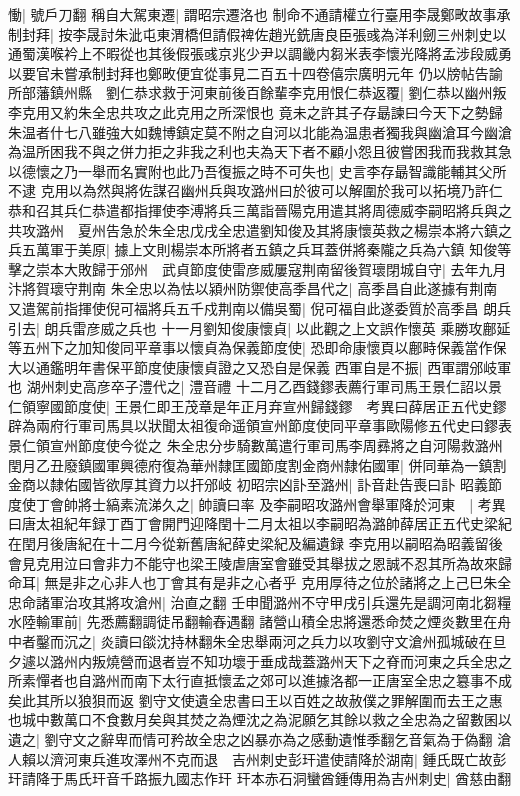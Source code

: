 慟|{
	號戶刀翻}
稱自大駕東遷|{
	謂昭宗遷洛也}
制命不通請權立行臺用李晟鄭畋故事承制封拜|{
	按李晟討朱泚屯東渭橋但請假禆佐趙光銑唐良臣張彧為洋利劒三州刺史以通蜀漢喉衿上不暇從也其後假張彧京兆少尹以調畿内芻米表李懷光降將孟涉段威勇以要官未嘗承制封拜也鄭畋便宜從事見二百五十四卷僖宗廣明元年}
仍以牓帖告諭所部藩鎮州縣　劉仁恭求救于河東前後百餘輩李克用恨仁恭返覆|{
	劉仁恭以幽州叛李克用又約朱全忠共攻之此克用之所深恨也}
竟未之許其子存朂諫曰今天下之勢歸朱温者什七八雖強大如魏博鎮定莫不附之自河以北能為温患者獨我與幽滄耳今幽滄為温所困我不與之併力拒之非我之利也夫為天下者不顧小怨且彼嘗困我而我救其急以德懷之乃一舉而名實附也此乃吾復振之時不可失也|{
	史言李存朂智識能輔其父所不逮}
克用以為然與將佐謀召幽州兵與攻潞州曰於彼可以解圍於我可以拓境乃許仁恭和召其兵仁恭遣都指揮使李溥將兵三萬詣晉陽克用遣其將周德威李嗣昭將兵與之共攻潞州　夏州告急於朱全忠戊戌全忠遣劉知俊及其將康懷英救之楊崇本將六鎮之兵五萬軍于美原|{
	據上文則楊崇本所將者五鎮之兵耳蓋併將秦隴之兵為六鎮}
知俊等擊之崇本大敗歸于邠州　武貞節度使雷彦威屢寇荆南留後賀瓌閉城自守|{
	去年九月汴將賀瓌守荆南}
朱全忠以為怯以潁州防禦使高季昌代之|{
	高季昌自此遂據有荆南}
又遣駕前指揮使倪可福將兵五千戍荆南以備吳蜀|{
	倪可福自此遂委質於高季昌}
朗兵引去|{
	朗兵雷彦威之兵也}
十一月劉知俊康懷貞|{
	以此觀之上文誤作懷英}
乘勝攻鄜延等五州下之加知俊同平章事以懷貞為保義節度使|{
	恐即命康懷頁以鄜畤保義當作保大以通鑑明年書保平節度使康懷貞證之又恐自是保義}
西軍自是不振|{
	西軍謂邠岐軍也}
湖州刺史高彦卒子澧代之|{
	澧音禮}
十二月乙酉錢鏐表薦行軍司馬王景仁詔以景仁領寧國節度使|{
	王景仁即王茂章是年正月弃宣州歸錢鏐　考異曰薛居正五代史鏐辟為兩府行軍司馬具以狀聞太祖復命遥領宣州節度使同平章事歐陽修五代史曰鏐表景仁領宣州節度使今從之}
朱全忠分步騎數萬遣行軍司馬李周彞將之自河陽救潞州　閏月乙丑廢鎮國軍興德府復為華州隸匡國節度割金商州隸佑國軍|{
	併同華為一鎮割金商以隸佑國皆欲厚其資力以扞邠岐}
初昭宗凶訃至潞州|{
	訃音赴告喪曰訃}
昭義節度使丁會帥將士縞素流涕久之|{
	帥讀曰率}
及李嗣昭攻潞州會舉軍降於河東　|{
	考異曰唐太祖紀年録丁酉丁會開門迎降閏十二月太祖以李嗣昭為潞帥薛居正五代史梁紀在閏月後唐紀在十二月今從新舊唐紀薛史梁紀及編遺録}
李克用以嗣昭為昭義留後會見克用泣曰會非力不能守也梁王陵虐唐室會雖受其舉拔之恩誠不忍其所為故來歸命耳|{
	無是非之心非人也丁會其有是非之心者乎}
克用厚待之位於諸將之上己巳朱全忠命諸軍治攻其將攻滄州|{
	治直之翻}
壬申聞潞州不守甲戌引兵還先是調河南北芻糧水陸輸軍前|{
	先悉薦翻調徒吊翻輸舂遇翻}
諸營山積全忠將還悉命焚之煙炎數里在舟中者鑿而沉之|{
	炎讀曰燄沈持林翻朱全忠舉兩河之兵力以攻劉守文滄州孤城破在旦夕遽以潞州内叛燒營而退者豈不知功壞于垂成哉蓋潞州天下之脊而河東之兵全忠之所素憚者也自潞州而南下太行直抵懷孟之郊可以進據洛都一正唐室全忠之簒事不成矣此其所以狼狽而返}
劉守文使遺全忠書曰王以百姓之故赦僕之罪解圍而去王之惠也城中數萬口不食數月矣與其焚之為煙沈之為泥願乞其餘以救之全忠為之留數囷以遺之|{
	劉守文之辭卑而情可矜故全忠之凶暴亦為之感動遺惟季翻乞音氣為于偽翻}
滄人賴以濟河東兵進攻澤州不克而退　吉州刺史彭玕遣使請降於湖南|{
	鍾氏既亡故彭玕請降于馬氏玕音千路振九國志作玕}
玕本赤石洞蠻酋鍾傳用為吉州刺史|{
	酋慈由翻}


